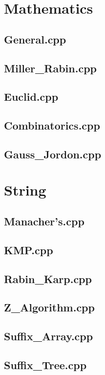 \section{Mathematics}
\subsection{General.cpp}

\subsection{Miller\_Rabin.cpp}

\subsection{Euclid.cpp}

\subsection{Combinatorics.cpp}

\subsection{Gauss\_Jordon.cpp}

\section{String}
\subsection{Manacher's.cpp}

\subsection{KMP.cpp}

\subsection{Rabin\_Karp.cpp}

\subsection{Z\_Algorithm.cpp}

\subsection{Suffix\_Array.cpp}

\subsection{Suffix\_Tree.cpp}

